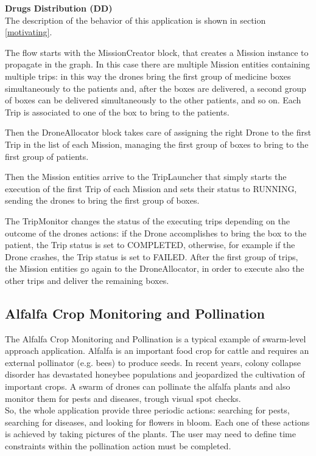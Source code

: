 \textbf{Drugs Distribution (DD)}
\\

The description of the behavior of this application is shown in section \ref{motivating}.

The flow starts with the MissionCreator block, that creates a Mission instance to propagate in the graph.
In this case there are multiple Mission entities containing multiple trips:
in this way the drones bring the first group of medicine boxes simultaneously to the patients and, after the boxes are delivered, a second group of boxes can be delivered simultaneously to the other patients, and so on.
Each Trip is associated to one of the box to bring to the patients.

Then the DroneAllocator block takes care of assigning the right Drone to the first Trip in the list of each Mission, managing the first group of boxes to bring to the first group of patients.

Then the Mission entities arrive to the TripLauncher that simply starts the execution of the first Trip of each Mission and sets their status to RUNNING, sending the drones to bring the first group of boxes.

The TripMonitor changes the status of the executing trips depending on the outcome of the drones actions:
if the Drone accomplishes to bring the box to the patient, the Trip status is set to COMPLETED, otherwise, for example if the Drone crashes, the Trip status is set to FAILED.
After the first group of trips, the Mission entities go again to the DroneAllocator, in order to execute also the other trips and deliver the remaining boxes.

\newpage

\subsection{Alfalfa Crop Monitoring and Pollination}\label{alfalfa}

The Alfalfa Crop Monitoring and Pollination\cite{alfalfa} is a typical example of swarm-level approach application.
Alfalfa is an important food crop for cattle and requires an external pollinator (e.g. bees) to produce seeds. In recent years, colony collapse disorder has devastated honeybee populations and jeopardized the cultivation of important crops\cite{colony}.
A swarm of drones can pollinate the alfalfa plants and also monitor them for pests and diseases, trough visual spot checks.
\\
So, the whole application provide three periodic actions: searching for pests, searching for diseases, and looking for flowers in bloom.
Each one of these actions is achieved by taking pictures of the plants.
The user may need to define time constraints within the pollination action must be completed.

